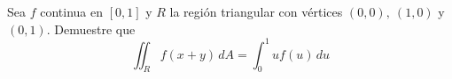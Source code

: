 \item Sea $f$ continua en $[0, 1]$ y $R$ la región triangular con vértices $(0, 0), \ (1, 0)$ y $(0, 1)$. Demuestre que
\[ \iint_R f(x + y) \, dA = \int_0^1 u f(u) \, du \]
